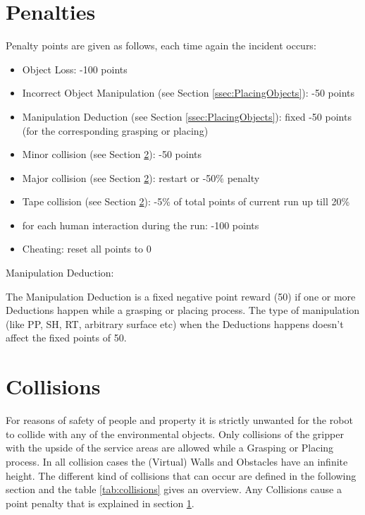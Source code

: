 \section{Penalties}
\label{sec:penalties}
Penalty points are given as follows, each time again the incident occurs:

\begin{itemize}
	\item Object Loss: \hfill -100 points
	\item Incorrect Object Manipulation (see Section \ref{ssec:PlacingObjects}): \hfill -50 points
	\item Manipulation Deduction (see Section \ref{ssec:PlacingObjects}): \hfill fixed -50 points (for the corresponding grasping or placing)
	\item Minor collision (see Section \ref{sec:Collisions}): \hfill -50 points
	\item Major collision (see Section \ref{sec:Collisions}): \hfill restart or -50\% penalty
  \item Tape collision (see Section \ref{sec:Collisions}): \hfill -5\% of total points of current run up till
  20\%
  \item for each human interaction during the run: \hfill  -100 points
  \item Cheating: \hfill reset all points to 0
\end{itemize}

Manipulation Deduction:

The Manipulation Deduction is a fixed negative point reward (50) if one or more Deductions happen while a grasping or placing process. The type of manipulation (like PP, SH, RT, arbitrary surface etc) when the Deductions happens doesn't affect the fixed points of 50.

\section{Collisions}\label{sec:Collisions}

For reasons of safety of people and property it is strictly unwanted for the robot to collide
with any of the environmental objects. Only collisions of the gripper with the upside of
the service areas are allowed while a Grasping or Placing process. In all collision cases the (Virtual) Walls and Obstacles have an infinite height. The different kind of collisions that can occur are defined in the
following section and the table \ref{tab:collisions} gives an overview. Any Collisions cause a point penalty that is explained in section \ref{sec:penalties}.  

